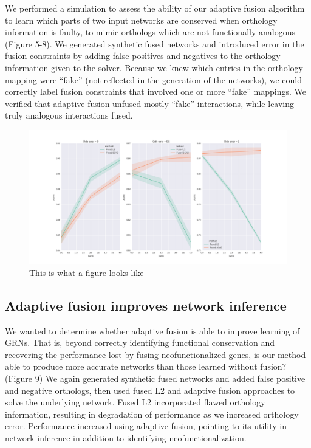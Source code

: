 \documentclass[11pt]{article}
\begin{document}
We performed a simulation to assess the ability of our adaptive fusion algorithm to learn which parts of two input networks are conserved when orthology information is faulty, to mimic orthologs which are not functionally analogous  (Figure 5-8). We generated synthetic fused networks and introduced error in the fusion constraints by adding false positives and negatives to the orthology information given to the solver. Because we knew which entries in the orthology mapping were ``fake'' (not reflected in the generation of the networks), we could correctly label fusion constraints that involved one or more ``fake'' mappings. We verified that adaptive-fusion unfused mostly ``fake'' interactions, while leaving truly analogous interactions fused.

\begin{figure}
\begin{center}
  \includegraphics[scale=0.45]{test_scad_opt_params3.png}
  \caption{\label{fig:figure1} This is what a figure looks like}
  \end{center}
\end{figure}

\subsection{Adaptive fusion improves network inference}
We wanted to determine whether adaptive fusion is able to improve learning of GRNs. That is, beyond correctly identifying functional conservation and recovering the performance lost by fusing neofunctionalized genes, is our method able to produce more accurate networks than those learned without fusion? (Figure 9) We again generated synthetic fused networks and added false positive and negative orthologs, then used fused L2 and adaptive fusion approaches to solve the underlying network. Fused L2 incorporated flawed orthology information, resulting in degradation of performance as we increased orthology error. Performance increased using adaptive fusion, pointing to its utility in network inference in addition to identifying neofunctionalization.
\end{document}
